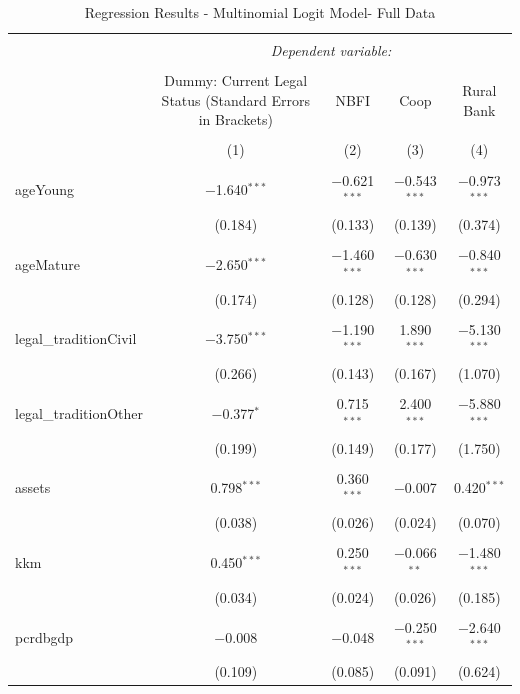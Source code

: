 \documentclass[a4paper,nobind]{templates/ociamthesis}
\begin{document}
\begin{table}[!htbp] \centering 
  \caption{Regression Results - Multinomial Logit Model- Full Data} 
  \label{} 
\footnotesize 
\begin{tabular}{@{\extracolsep{5pt}}lcccc} 
\\[-1.8ex]\hline 
\hline \\[-1.8ex] 
 & \multicolumn{4}{c}{\textit{Dependent variable:}} \\ 
\cline{2-5} 
\\[-1.8ex] & Dummy: Current Legal Status (Standard Errors in Brackets) & NBFI & Coop & Rural Bank \\ 
\\[-1.8ex] & (1) & (2) & (3) & (4)\\ 
\hline \\[-1.8ex] 
 ageYoung & $-$1.640$^{***}$ & $-$0.621$^{***}$ & $-$0.543$^{***}$ & $-$0.973$^{***}$ \\ 
  & (0.184) & (0.133) & (0.139) & (0.374) \\ 
  & & & & \\ 
 ageMature & $-$2.650$^{***}$ & $-$1.460$^{***}$ & $-$0.630$^{***}$ & $-$0.840$^{***}$ \\ 
  & (0.174) & (0.128) & (0.128) & (0.294) \\ 
  & & & & \\ 
 legal\_traditionCivil & $-$3.750$^{***}$ & $-$1.190$^{***}$ & 1.890$^{***}$ & $-$5.130$^{***}$ \\ 
  & (0.266) & (0.143) & (0.167) & (1.070) \\ 
  & & & & \\ 
 legal\_traditionOther & $-$0.377$^{*}$ & 0.715$^{***}$ & 2.400$^{***}$ & $-$5.880$^{***}$ \\ 
  & (0.199) & (0.149) & (0.177) & (1.750) \\ 
  & & & & \\ 
 assets & 0.798$^{***}$ & 0.360$^{***}$ & $-$0.007 & 0.420$^{***}$ \\ 
  & (0.038) & (0.026) & (0.024) & (0.070) \\ 
  & & & & \\ 
 kkm & 0.450$^{***}$ & 0.250$^{***}$ & $-$0.066$^{**}$ & $-$1.480$^{***}$ \\ 
  & (0.034) & (0.024) & (0.026) & (0.185) \\ 
  & & & & \\ 
 pcrdbgdp & $-$0.008 & $-$0.048 & $-$0.250$^{***}$ & $-$2.640$^{***}$ \\ 
  & (0.109) & (0.085) & (0.091) & (0.624) \\ 

\end{tabular}
\end{table}
\end{document}
